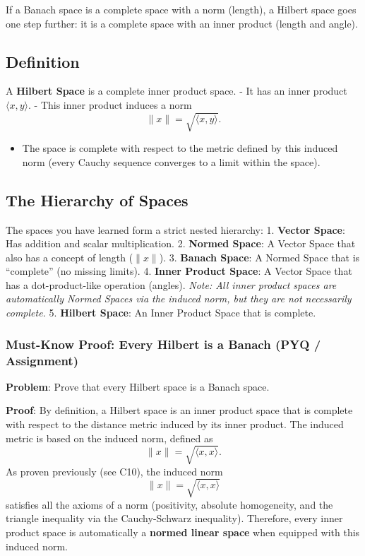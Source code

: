 \documentclass[
]{article}
\providecommand{\tightlist}{%
  \setlength{\itemsep}{0pt}\setlength{\parskip}{0pt}}
\begin{document}
If a Banach space is a complete space with a norm (length), a Hilbert
space goes one step further: it is a complete space with an inner
product (length and angle).

\subsection{Definition}\label{definition-16}

A \textbf{Hilbert Space} is a complete inner product space. - It has an
inner product \(\langle x, y \rangle\). - This inner product induces a
norm
\[
\|x\| = \sqrt{\langle x, y \rangle}.
\]
\begin{itemize}
\tightlist
\item
  The space is complete with respect to the metric defined by this
  induced norm (every Cauchy sequence converges to a limit within the
  space).
\end{itemize}

\subsection{The Hierarchy of Spaces}\label{the-hierarchy-of-spaces}

The spaces you have learned form a strict nested hierarchy: 1.
\textbf{Vector Space}: Has addition and scalar multiplication. 2.
\textbf{Normed Space}: A Vector Space that also has a concept of length
(\(\|x\|\)). 3. \textbf{Banach Space}: A Normed Space that is
``complete'' (no missing limits). 4. \textbf{Inner Product Space}: A
Vector Space that has a dot-product-like operation (angles). \emph{Note:
All inner product spaces are automatically Normed Spaces via the induced
norm, but they are not necessarily complete.} 5. \textbf{Hilbert Space}:
An Inner Product Space that is complete.

\subsubsection{Must-Know Proof: Every Hilbert is a Banach (PYQ /
Assignment)}\label{must-know-proof-every-hilbert-is-a-banach-pyq-assignment}

\textbf{Problem}: Prove that every Hilbert space is a Banach space.

\textbf{Proof}: By definition, a Hilbert space is an inner product space
that is complete with respect to the distance metric induced by its
inner product. The induced metric is based on the induced norm, defined
as
\[
\|x\| = \sqrt{\langle x, x \rangle}.
\]
As proven previously (see C10), the induced norm
\[
\|x\| = \sqrt{\langle x, x \rangle}
\]
satisfies all the axioms of a norm (positivity, absolute homogeneity,
and the triangle inequality via the Cauchy-Schwarz inequality).
Therefore, every inner product space is automatically a \textbf{normed
linear space} when equipped with this induced norm.
\end{document}
